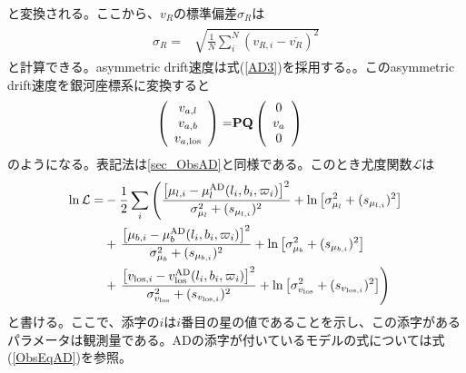 と変換される。ここから、$v_R$の標準偏差$\sigma_R$は
\begin{align}
\begin{aligned}
	\sigma_R =& \sqrt{\frac{1}{N}\sum^N_i(v_{R,i} - \overline{v_R})^2}
\end{aligned}
\end{align}
と計算できる。asymmetric drift速度は式(\ref{AD3})を採用する。。このasymmetric drift速度を銀河座標系に変換すると
\begin{align}
\begin{aligned}
	\left(
	\begin{array}{c}
	 	v_{a,l}\\
		v_{a,b}\\
		v_{a,\mathrm{los}}
	\end{array}
	\right)
	=& \bf{P} \bf{Q}
	\left(
	\begin{array}{c}
	 	0\\
		v_a\\
		0
	\end{array}
	\right)
\end{aligned}
\end{align}
のようになる。表記法は\ref{sec_ObsAD}と同様である。このとき尤度関数$\mathcal{L}$は
\begin{align}
\begin{aligned}
	\ln \mathcal{L} =& -\frac{1}{2}\sum_i \left(\frac{\left[\mu_{l,i} - \mu_l^{\mathrm{AD}}(l_i,b_i,\varpi_i)\right]^2}{\sigma_{\mu_l}^2 + (s_{\mu_{l,i}})^2}  + {\rm ln}\left[\sigma_{\mu_l}^2 + (s_{\mu_{l,i}})^2\right] \right. \\
	&+ \left. \frac{\left[\mu_{b,i} - \mu_b^{\mathrm{AD}}(l_i,b_i,\varpi_i)\right]^2}{\sigma_{\mu_b}^2 + (s_{\mu_{b,i}})^2}  + {\rm ln}\left[\sigma_{\mu_b}^2 + (s_{\mu_{b,i}})^2\right] \right. \\
	&+ \left. \frac{\left[v_{\mathrm{los},i} - v^{\mathrm{AD}}_{\mathrm{los}}(l_i,b_i,\varpi_i)\right]^2}{\sigma_{v_{\mathrm{los}}}^2 + (s_{v_{\mathrm{los},i}})^2} + {\rm ln}\left[\sigma_{v_{\mathrm{los}}}^2 + (s_{v_{\mathrm{los},i}})^2\right] \right)
\end{aligned}
\end{align}
と書ける。ここで、添字の$i$は$i$番目の星の値であることを示し、この添字があるパラメータは観測量である。ADの添字が付いているモデルの式については式(\ref{ObsEqAD})を参照。



